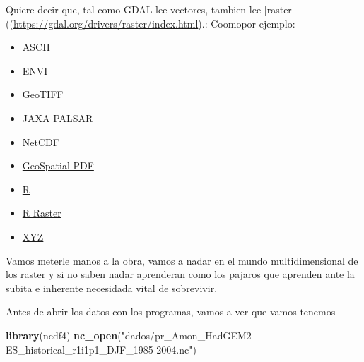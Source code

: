 \documentclass[]{book}
\newenvironment{Shaded}{\begin{snugshade}}{\end{snugshade}}
\newcommand{\KeywordTok}[1]{\textcolor[rgb]{0.13,0.29,0.53}{\textbf{#1}}}
\newcommand{\NormalTok}[1]{#1}
\newcommand{\StringTok}[1]{\textcolor[rgb]{0.31,0.60,0.02}{#1}}
\providecommand{\tightlist}{%
  \setlength{\itemsep}{0pt}\setlength{\parskip}{0pt}}
\begin{document}
Quiere decir que, tal como GDAL lee vectores, tambien lee {[}raster{]}((\url{https://gdal.org/drivers/raster/index.html}).: Coomopor ejemplo:

\begin{itemize}
\tightlist
\item
  \href{https://gdal.org/drivers/raster/aaigrid.html}{ASCII}
\item
  \href{https://gdal.org/drivers/raster/envi.html}{ENVI}
\item
  \href{https://gdal.org/drivers/raster/gtiff.html}{GeoTIFF}
\item
  \href{https://gdal.org/drivers/raster/palsar.html}{JAXA PALSAR}
\item
  \href{https://gdal.org/drivers/raster/netcdf.html}{NetCDF}
\item
  \href{https://gdal.org/drivers/raster/pdf.html}{GeoSpatial PDF}
\item
  \href{https://gdal.org/drivers/raster/r.html}{R}
\item
  \href{https://gdal.org/drivers/raster/rraster.html}{R Raster}
\item
  \href{https://gdal.org/drivers/raster/xyz.html}{XYZ}
\end{itemize}

Vamos meterle manos a la obra, vamos a nadar en el mundo multidimensional de los raster y si no saben nadar aprenderan como los pajaros que aprenden ante la subita e inherente necesidada vital de sobrevivir.

Antes de abrir los datos con los programas, vamos a ver que vamos tenemos

\begin{Shaded}
\begin{Highlighting}[]
\KeywordTok{library}\NormalTok{(ncdf4)}
\KeywordTok{nc_open}\NormalTok{(}\StringTok{"dados/pr_Amon_HadGEM2-ES_historical_r1i1p1_DJF_1985-2004.nc"}\NormalTok{)}
\end{Highlighting}
\end{Shaded}
\end{document}

